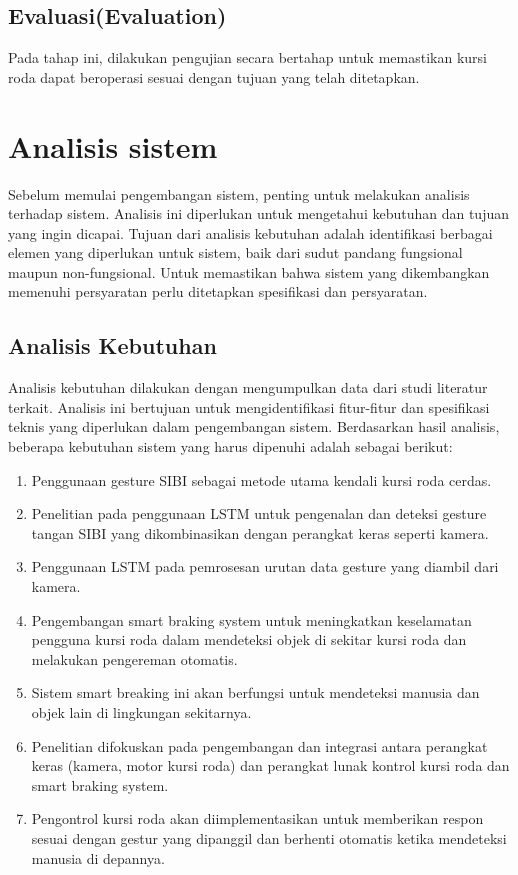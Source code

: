 \subsection{Evaluasi(Evaluation)}
Pada tahap ini, dilakukan pengujian secara bertahap untuk memastikan kursi roda dapat beroperasi sesuai dengan tujuan yang telah ditetapkan.

\section{Analisis sistem}
Sebelum memulai pengembangan sistem, penting untuk melakukan analisis terhadap sistem.
Analisis ini diperlukan untuk mengetahui kebutuhan dan tujuan yang ingin dicapai. Tujuan dari analisis kebutuhan adalah identifikasi berbagai elemen yang diperlukan untuk sistem, baik dari sudut pandang fungsional maupun non-fungsional. Untuk memastikan bahwa sistem yang dikembangkan memenuhi persyaratan perlu ditetapkan spesifikasi dan persyaratan.

\subsection{Analisis Kebutuhan}
Analisis kebutuhan dilakukan dengan mengumpulkan data dari studi literatur terkait. Analisis ini bertujuan untuk mengidentifikasi fitur-fitur dan spesifikasi teknis yang diperlukan dalam pengembangan sistem. Berdasarkan hasil analisis, beberapa
kebutuhan sistem yang harus dipenuhi adalah sebagai berikut:
\begin{enumerate}
    \item Penggunaan gesture SIBI sebagai metode utama kendali kursi roda cerdas.
    \item Penelitian pada penggunaan LSTM untuk pengenalan dan deteksi gesture tangan SIBI yang dikombinasikan dengan perangkat keras seperti kamera.
    \item Penggunaan LSTM pada pemrosesan urutan data gesture yang diambil dari kamera.
    \item Pengembangan smart braking system untuk meningkatkan keselamatan pengguna kursi roda dalam mendeteksi objek di sekitar kursi roda dan melakukan pengereman otomatis. 
    \item Sistem smart breaking ini akan berfungsi untuk mendeteksi manusia dan objek lain di lingkungan sekitarnya.
    \item Penelitian difokuskan pada pengembangan dan integrasi antara perangkat keras (kamera, motor kursi roda) dan perangkat lunak kontrol kursi roda dan smart braking system.
    \item Pengontrol kursi roda akan diimplementasikan untuk memberikan respon sesuai dengan gestur yang dipanggil dan berhenti otomatis ketika mendeteksi manusia di depannya.
\end{enumerate}
